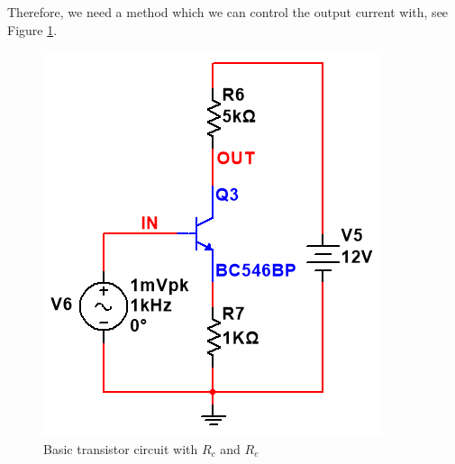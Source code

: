 Therefore, we need a method  which we can control the output current with, see Figure \ref{fig:basictransistorcircuitwithRcandRe}.

\begin{figure}[htbp]
\centering
\includegraphics[scale=0.7]{"../Photo/Chap1/basic transistor circuit with Rc and Re"}
\caption{Basic transistor circuit with $R_c$ and $R_e$}
\label{fig:basictransistorcircuitwithRcandRe}
\end{figure}
